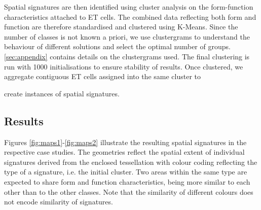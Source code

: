 
Spatial signatures are then identified using cluster analysis on the
form-function characteristics attached to ET cells. 
The combined data reflecting both form and function are therefore standardised and
clustered using K-Means. Since the number of classes is not known a priori,
we use clustergrams \citep{schonlau2002clustergram} to understand the
behaviour of different solutions and select the optimal number of groups.
\ref{sec:appendix} contains details on the clustergrams used.
The final clustering is run with 1000 initialisations to ensure stability of
results.
Once clustered, we
aggregate contiguous ET cells assigned into the same cluster to

create instances of spatial signatures.


\subsection{Results}

Figures \ref{fig:maps1}-\ref{fig:maps2} illustrate the resulting spatial signatures in the respective case
studies. The geometries reflect the spatial extent of individual signatures
derived from the enclosed tessellation
with colour coding reflecting the type of a signature, i.e. the initial cluster. Two
areas within the same type are expected to share form and function characteristics, being more similar to each other than to the
other classes. Note that the similarity of different colours does not encode
similarity of signatures.

